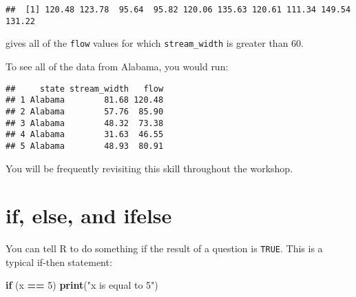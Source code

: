 \documentclass[]{book}
\newenvironment{Shaded}{\begin{snugshade}}{\end{snugshade}}
\newcommand{\KeywordTok}[1]{\textcolor[rgb]{0.13,0.29,0.53}{\textbf{#1}}}
\newcommand{\DecValTok}[1]{\textcolor[rgb]{0.00,0.00,0.81}{#1}}
\newcommand{\StringTok}[1]{\textcolor[rgb]{0.31,0.60,0.02}{#1}}
\newcommand{\CommentTok}[1]{\textcolor[rgb]{0.56,0.35,0.01}{\textit{#1}}}
\newcommand{\ControlFlowTok}[1]{\textcolor[rgb]{0.13,0.29,0.53}{\textbf{#1}}}
\newcommand{\OperatorTok}[1]{\textcolor[rgb]{0.81,0.36,0.00}{\textbf{#1}}}
\newcommand{\NormalTok}[1]{#1}
\theoremstyle{definition}
\theoremstyle{definition}
\theoremstyle{definition}
\theoremstyle{remark}
\begin{document}
\begin{Shaded}
\end{Shaded}

\begin{verbatim}
##  [1] 120.48 123.78  95.64  95.82 120.06 135.63 120.61 111.34 149.54 131.22
\end{verbatim}

gives all of the \texttt{flow} values for which \texttt{stream\_width}
is greater than 60.

To see all of the data from Alabama, you would run:

\begin{Shaded}
\end{Shaded}

\begin{verbatim}
##     state stream_width   flow
## 1 Alabama        81.68 120.48
## 2 Alabama        57.76  85.90
## 3 Alabama        48.32  73.38
## 4 Alabama        31.63  46.55
## 5 Alabama        48.93  80.91
\end{verbatim}

You will be frequently revisiting this skill throughout the workshop.

\section{if, else, and ifelse}\label{if-else-and-ifelse}

You can tell R to do something if the result of a question is
\texttt{TRUE}. This is a typical if-then statement:

\begin{Shaded}
\begin{Highlighting}[]
\ControlFlowTok{if}\NormalTok{ (x }\OperatorTok{==}\StringTok{ }\DecValTok{5}\NormalTok{) }\KeywordTok{print}\NormalTok{(}\StringTok{"x is equal to 5"}\NormalTok{)}
\end{Highlighting}
\end{Shaded}
\end{document}
